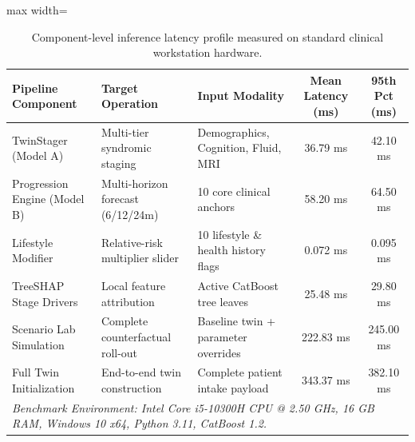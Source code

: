\begin{table}[t]
\centering
\caption{Component-level inference latency profile measured on standard clinical workstation hardware.}
\label{tab:runtime_latency}
\small
\begin{adjustbox}{max width=\linewidth}
\begin{tabular}{lllcc}
\toprule
\textbf{Pipeline Component} & \textbf{Target Operation} & \textbf{Input Modality} & \textbf{Mean Latency (ms)} & \textbf{95th Pct (ms)} \\
\midrule
TwinStager (Model A)        & Multi-tier syndromic staging      & Demographics, Cognition, Fluid, MRI & 36.79 ms & 42.10 ms \\
Progression Engine (Model B)& Multi-horizon forecast (6/12/24m) & 10 core clinical anchors            & 58.20 ms & 64.50 ms \\
Lifestyle Modifier          & Relative-risk multiplier slider   & 10 lifestyle \& health history flags& 0.072 ms & 0.095 ms \\
TreeSHAP Stage Drivers      & Local feature attribution         & Active CatBoost tree leaves         & 25.48 ms & 29.80 ms \\
Scenario Lab Simulation     & Complete counterfactual roll-out  & Baseline twin + parameter overrides & 222.83 ms & 245.00 ms \\
Full Twin Initialization    & End-to-end twin construction      & Complete patient intake payload     & 343.37 ms & 382.10 ms \\
\midrule
\multicolumn{5}{l}{\textit{Benchmark Environment: Intel Core i5-10300H CPU @ 2.50 GHz, 16 GB RAM, Windows 10 x64, Python 3.11, CatBoost 1.2.}} \\
\bottomrule
\end{tabular}
\end{adjustbox}
\end{table}
